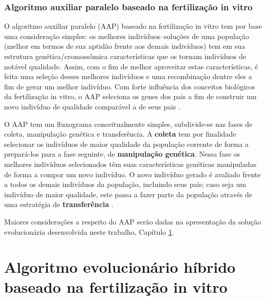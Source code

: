 \documentclass[relatorio,nocolorlinks]{inf-ufg}
\begin{document}
\subsection{Algoritmo auxiliar paralelo baseado na fertiliza\c{c}\~{a}o in vitro}

O algoritmo auxiliar paralelo (AAP) baseado na fertiliza\c{c}\~{a}o in vitro tem por base uma considera\c{c}\~{a}o simples: os melhores
indiv\'{i}duos--solu\c{c}\~{o}es de uma popula\c{c}\~{a}o (melhor em termos de sua aptid\~{a}o frente aos demais indiv\'{i}duos) tem em sua
estrutura gen\'{e}tica/cromoss\^{o}mica caracter\'{i}sticas que os tornam indiv\'{i}duos de not\'{a}vel qualidade. Assim, com o fim de melhor
aproveitar estas caracter\'{i}sticas, \'{e} feita uma sele\c{c}\~{a}o desses melhores indiv\'{i}duos e uma recombina\c{c}\~{a}o dentre eles a
fim de gerar um melhor indiv\'{i}duo. Com forte influ\^{e}ncia dos conceitos biol\'{o}gicos da fertiliza\c{c}\~{a}o in vitro, o AAP seleciona
os genes dos pais a fim de construir um novo indiv\'{i}duo de qualidade compar\'{a}vel a de seus pais \cite{Camilo2010}.

O AAP tem um fluxograma conceitualmente simples, subdivide-se nas fases de coleta, manipula\c{c}\~{a}o gen\'{e}tica e transfer\^{e}ncia. A
\textbf{coleta} tem por finalidade selecionar os indiv\'{i}duos de maior qualidade da popula\c{c}\~{a}o corrente de forma a prepar\'{a}-los para
a fase seguinte, de \textbf{manipula\c{c}\~{a}o gen\'{e}tica}. Nessa fase os melhores indiv\'{i}duos selecionados t\^{e}m suas caracter\'{i}sticas
gen\'{e}ticas manipuladas de forma a compor um novo indiv\'{i}duo. O novo indiv\'{i}duo gerado \'{e} avaliado frente a todos os demais
indiv\'{i}duos da popula\c{c}\~{a}o, incluindo seus pais; caso seja um indiv\'{i}duo de maior qualidade, este passa a fazer parte da
popula\c{c}\~{a}o atrav\'{e}s de uma estrat\'{e}gia de \textbf{transfer\^{e}ncia} \cite{Camilo2010}.

Maiores considera\c{c}\~{o}es a respeito do AAP ser\~{a}o dadas na apresenta\c{c}\~{a}o da solu\c{c}\~{a}o evolucion\'{a}ria desenvolvida neste
trabalho, Cap\'{i}tulo \ref{solucao}.

\chapter{Algoritmo evolucion\'{a}rio h\'{i}brido baseado na fertiliza\c{c}\~{a}o in vitro}
\label{solucao}
\end{document}
